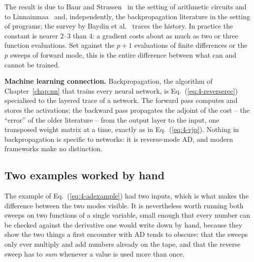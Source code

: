 The result is due to Baur and Strassen~\cite{baur1983} in the setting of
arithmetic circuits and to Linnainmaa~\cite{linnainmaa1976} and, independently,
the backpropagation literature in the setting of programs; the survey by
Baydin et al.~\cite{baydin2018} traces the history.  In practice the constant
is nearer $2$--$3$ than $4$: a gradient costs about as much as two or three
function evaluations.  Set against the $p+1$ evaluations of finite
differences or the $p$ sweeps of forward mode, this is the entire difference
between what can and cannot be trained.

\begin{notebox}
\textbf{Machine learning connection.}
Backpropagation, the algorithm of Chapter~\ref{chap:nn} that trains every
neural network, is Eq.~(\ref{eq:4-reverserec}) specialised to the layered
trace of a network.  The forward pass computes and stores the activations;
the backward pass propagates the adjoint of the cost -- the ``error'' of the
older literature -- from the output layer to the input, one transposed
weight matrix at a time, exactly as in Eq.~(\ref{eq:4-vjp}).  Nothing in
backpropagation is specific to networks: it is reverse-mode AD, and modern
frameworks make no distinction.
\end{notebox}

\subsection{Two examples worked by hand}
\label{sec:adexamples}

The example of Eq.~(\ref{eq:4-adexample}) had two inputs, which is what
makes the difference between the two modes visible.  It is nevertheless
worth running both sweeps on two functions of a single variable, small
enough that every number can be checked against the derivative one would
write down by hand, because they show the two things a first encounter with
AD tends to obscure: that the sweeps only ever multiply and add numbers
already on the tape, and that the reverse sweep has to \emph{sum} whenever a
value is used more than once.

